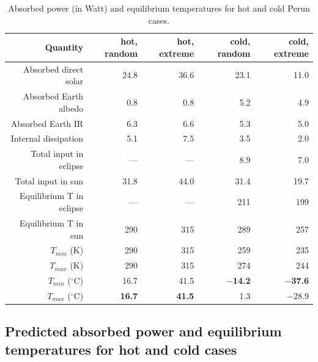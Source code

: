 \documentclass[]{aastex62}
\begin{document}
\begin{table}[t]
	\centering
	\caption{Absorbed power (in Watt) and equilibrium temperatures for hot and cold Perun cases. }
	\label{tab:powertemp}
	\begin{tabular}{r|r|r|r|r} %
		\hline
  	                    Quantity          & hot, random   &  hot, extreme &   cold, random  & cold, extreme   \\
		\hline
           Absorbed direct solar         &  24.8        &  36.6     &  23.1         &  11.0      \\
           Absorbed Earth albedo       &    0.8        &    0.8   &     5.2           &  4.9      \\    
               Absorbed Earth IR           &    6.3        &    6.6     &     5.3        &  5.0     \\
             Internal dissipation           &    5.1        &   7.5     &     3.5         &  2.0     \\
		\hline 
             Total input in eclipse       &     ---      &   ---   &     8.9       &    7.0  \\
              Total input in sun            &    31.8      &   44.0  &   31.4        &  19.7  \\
		\hline
              Equilibrium T in eclipse  &     ---     &    ---   &    211       &   199 \\
              Equilibrium T in sun       &      290      &   315   &    289        &  257  \\
 		\hline
                    $T_{min}$  (K)               &      290      &   315   &   259       &  235  \\
                   $T_{max}$  (K)               &      290      &   315   &   274        &  244  \\
		\hline
                    $T_{min}$  ($^\circ$C)   &       16.7         &  41.5             &  {\bf   $-$14.2  }  &  {\bf  $-$37.6}  \\
                   $T_{max}$  ($^\circ$C)    &  {\bf  16.7  }  &    {\bf  41.5}  &        1.3      &  $-$28.9   \\
		\hline
	\end{tabular} 
\end{table}

 


\subsection{Predicted absorbed power and equilibrium temperatures for hot and cold cases} 
\end{document}
